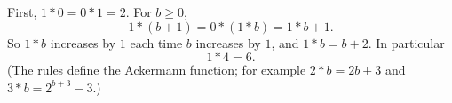 First, $1*0=0*1=2$. For $b\ge0$,
\[
1*(b+1)=0*(1*b)=1*b+1 .
\]
So $1*b$ increases by $1$ each time $b$ increases by $1$, and $1*b=b+2$. In particular
\[
1*4=\boxed{6}.
\]
(The rules define the Ackermann function; for example $2*b=2b+3$ and $3*b=2^{b+3}-3$.)
